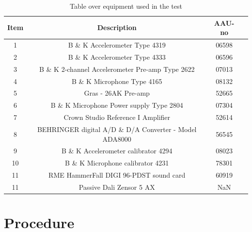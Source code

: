 \begin{table}[H]
\centering
{}
\begin{tabular}{S[table-format=1]ccc} \toprule
    {Item} & {Description} & {AAU-no} \\       &  B \& K Accelerometer Type 4319  & 06598   \\ 
    2      &  B \& K Accelerometer Type 4333  & 06596   \\ 
    3      &  B \& K 2-channel Accelerometer Pre-amp Type 2622  & 07013   \\
    4      &  B \& K Microphone Type 4165  & 08132   \\
    5      &  Gras - 26AK Pre-amp & 52665   \\
    6      &  B \& K Microphone Power supply Type 2804  & 07304   \\
    7      &  Crown Studio Reference I Amplifier & 52614   \\
    8      &  BEHRINGER digital A/D \& D/A Converter - Model ADA8000   & 56545   \\
    9      &  B \& K Accelerometer calibrator 4294 & 08023   \\
    10     &  B \& K Microphone calibrator 4231 & 78301   \\
    11     &  RME HammerFall DIGI 96-PDST sound card & 60919  \\
    11     &  Passive Dali Zensor 5 AX & NaN  \\ \bottomrule 
\end{tabular}
\caption{Table over equipment used in the test}
\label{tab:UsedEquipment1}
\end{table}
\vspace{-5mm}


\section{Procedure}\label{sec:SpeakerTestProcedure1}

